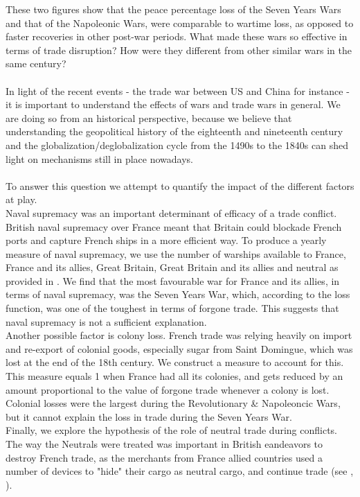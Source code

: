 \documentclass[12pt,a4paper,notitlepage]{article}
\begin{document}
These two figures show that the peace percentage loss of the Seven Years Wars and that of the Napoleonic Wars, were comparable to wartime loss, as opposed to faster recoveries in other post-war periods.
What made these wars so effective in terms of trade disruption?
How were they different from other similar wars in the same century? \\~\\
In light of the recent events - the trade war between US and China for instance - it is important to understand the effects of wars and trade wars in general. We are doing so from an historical perspective, because we believe that understanding the geopolitical history of the eighteenth and nineteenth century and the globalization/deglobalization cycle from the 1490s to the 1840s can shed light on mechanisms still in place nowadays.  \\~\\
To answer this question we attempt to quantify the impact of the different factors at play. \\
Naval supremacy was an important determinant of efficacy of a trade conflict.
British naval supremacy over France meant that Britain could blockade French ports and capture French ships in a more efficient way.
To produce a yearly measure of naval supremacy, we use the number of warships available to France, France and its allies, Great Britain, Great Britain and its allies and neutral as provided in \cite{modelski1988seapower}.
We find that the most favourable war for France and its allies, in terms of naval supremacy, was the Seven Years War, which, according to the loss function, was one of the toughest in terms of forgone trade.
This suggests that naval supremacy is not a sufficient explanation. \\ 
Another possible factor is colony loss. French trade was relying heavily on import and re-export of colonial goods, especially sugar from Saint Domingue, which was lost at the end of the 18th century. We construct a measure to account for this.
This measure equals 1 when France had all its colonies, and gets reduced by an amount proportional to the value of forgone trade whenever a colony is lost.
Colonial losses were the largest during the Revolutionary \& Napoleoncic Wars, but it cannot explain the loss in trade during the Seven Years War. \\
Finally, we explore the hypothesis of the role of neutral trade during conflicts. 
The way the Neutrals were treated was important in British eandeavors to destroy French trade, as the merchants from France allied countries used a number of devices to "hide" their cargo as neutral cargo, and continue trade (see \citep{carriere1973negociants}, \cite{schnakenbourg2013guerre}). 
\end{document}

